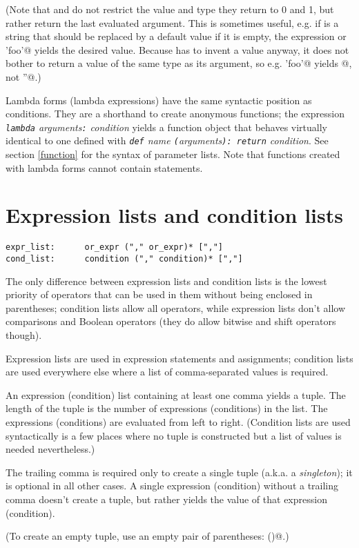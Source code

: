 (Note that \verb@and@ and \verb@or@ do not restrict the value and type
they return to 0 and 1, but rather return the last evaluated argument.
This is sometimes useful, e.g. if \verb@s@ is a string that should be
replaced by a default value if it is empty, the expression
\verb@s or 'foo'@ yields the desired value.  Because \verb@not@ has to
invent a value anyway, it does not bother to return a value of the
same type as its argument, so e.g. \verb@not 'foo'@ yields @,
not \verb@''@.)

Lambda forms (lambda expressions) have the same syntactic position as
conditions.  They are a shorthand to create anonymous functions; the
expression {\em {\tt lambda} arguments{\tt :} condition}
yields a function object that behaves virtually identical to one
defined with
{\em {\tt def} name {\tt (}arguments{\tt ): return} condition}.
See section \ref{function} for the syntax of
parameter lists.  Note that functions created with lambda forms cannot
contain statements.
\label{lambda}

\section{Expression lists and condition lists}

\begin{verbatim}
expr_list:      or_expr ("," or_expr)* [","]
cond_list:      condition ("," condition)* [","]
\end{verbatim}

The only difference between expression lists and condition lists is
the lowest priority of operators that can be used in them without
being enclosed in parentheses; condition lists allow all operators,
while expression lists don't allow comparisons and Boolean operators
(they do allow bitwise and shift operators though).

Expression lists are used in expression statements and assignments;
condition lists are used everywhere else where a list of
comma-separated values is required.

An expression (condition) list containing at least one comma yields a
tuple.  The length of the tuple is the number of expressions
(conditions) in the list.  The expressions (conditions) are evaluated
from left to right.  (Condition lists are used syntactically is a few
places where no tuple is constructed but a list of values is needed
nevertheless.)

The trailing comma is required only to create a single tuple (a.k.a. a
{\em singleton}); it is optional in all other cases.  A single
expression (condition) without a trailing comma doesn't create a
tuple, but rather yields the value of that expression (condition).

(To create an empty tuple, use an empty pair of parentheses:
\verb@()@.)
